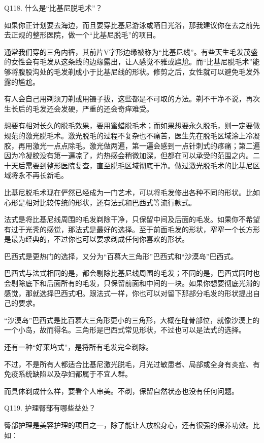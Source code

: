\documentclass[12pt,UTF8]{ctexbook}
\begin{document}
Q118. 什么是“比基尼脱毛术”？


如果你正计划要去海边，而且要穿比基尼游泳或晒日光浴，那我建议你在去之前先去正规的整形医院，做一个“比基尼脱毛”的项目。

通常我们穿的三角内裤，其前片V字形边缘被称为“比基尼线”。有些天生毛发茂盛的女性会有毛发从这条线的边缘露出，让人感觉不雅或尴尬。而“比基尼脱毛术”能够将腹股沟处的毛发剃成小于比基尼线的形状。修剪之后，女性就可以避免毛发外露的尴尬。

有人会自己用剃须刀剃或用镊子拔，这些都是不可取的方法。剃不干净不说，再次生长后的毛发还会发硬，严重的还会奇痒难受。

想要有相对长久的脱毛效果，要用蜜蜡脱毛术；而如果想要永久脱毛，则一定要做规范的激光脱毛术。激光脱毛的过程不复杂也不痛苦，医生先在脱毛区域涂上冷凝胶，再用激光一点点除毛。激光做两遍，第一遍会感到一点针刺式的疼痛；第二遍因为冷凝胶没有第一遍凉了，灼热感会稍微加深，但都在可以承受的范围之内。二十天后需要到整形医院复查，直至脱毛区域彻底干净。做过激光脱毛术的比基尼区域将永不再长新毛。

比基尼脱毛术现在俨然已经成为一门艺术，可以将毛发修出各种不同的形状。比如心形是相对比较传统的形状，还有法式和巴西式等流行款式。

法式是将比基尼线周围的毛发剃除干净，只保留中间及后面的毛发。如果你不希望有过于光秃的感觉，那法式是最好的选择。至于前面毛发的形状，窄窄一个长方形是最为经典的，不过你也可以要求剃成任何你喜欢的形状。

巴西式是更热门的选择，又分为“百慕大三角形”巴西式和“沙漠岛”巴西式。

巴西式与法式相同的是，都会剔除比基尼线周围的毛发；不同的是，巴西式同时也会剔除底下和后面所有的毛发，只保留前面和中间的一块。如果你想要彻底光滑的感觉，那就选择巴西式吧。跟法式一样，你也可以对留下那部分毛发的形状提出自己的要求。

“沙漠岛”巴西式是比百慕大三角形更小的三角形，大概在耻骨部位，就像沙漠上的一个小岛，故而得名。三角形是巴西式常见形状，不过也可以是法式的选择。

还有一种“好莱坞式”，是将所有毛发完全剃除。

不过，不是所有人都适合比基尼激光脱毛，月光过敏患者、局部或全身有炎症、有免疫系统缺陷以及孕妇都属于不宜人群。

而具体剃成什么样，要看个人审美。不剃，保留自然状态也没有任何问题。





Q119. 护理臀部有哪些益处？


臀部护理是美容护理的项目之一，除了能让人放松身心，还有很强的保养功效。比如：
\end{document}
